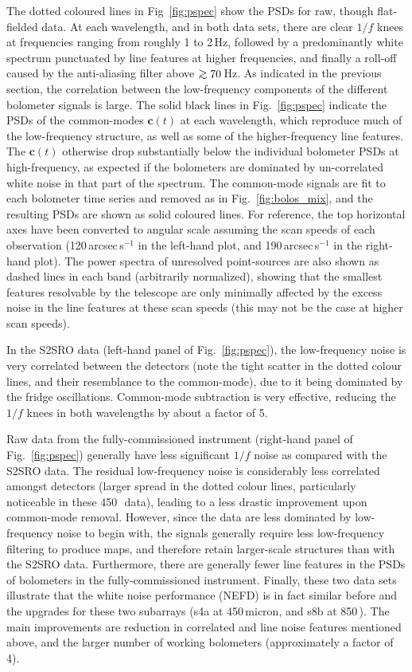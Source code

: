 \documentclass[useAMS,usenatbib,nofootinbib]{mn2e}
\def\gsim{\mathrel{\lower2.5pt\vbox{\lineskip=0pt\baselineskip=0pt
          \hbox{$>$}\hbox{$\sim$}}}}
\begin{document}
The dotted coloured lines in Fig~\ref{fig:pspec} show the PSDs for
raw, though flat-fielded data. At each wavelength, and in both data
sets, there are clear $1/f$ knees at frequencies ranging from roughly
1 to 2\,Hz, followed by a predominantly white spectrum punctuated by
line features at higher frequencies, and finally a roll-off caused by
the anti-aliasing filter above $\gsim 70$\,Hz. As indicated in the
previous section, the correlation between the low-frequency components
of the different bolometer signals is large. The solid black lines in
Fig.~\ref{fig:pspec} indicate the PSDs of the common-modes
$\mathbf{c}(t)$ at each wavelength, which reproduce much of the
low-frequency structure, as well as some of the higher-frequency line
features. The $\mathbf{c}(t)$ otherwise drop substantially below the
individual bolometer PSDs at high-frequency, as expected if the
bolometers are dominated by un-correlated white noise in that part of
the spectrum. The common-mode signals are fit to each bolometer time
series and removed as in Fig.~\ref{fig:bolos_mix}, and the resulting
PSDs are shown as solid coloured lines.  For reference, the top
horizontal axes have been converted to angular scale assuming the scan
speeds of each observation (120\,arcsec\,s$^{-1}$ in the left-hand
plot, and 190\,arcsec\,s$^{-1}$ in the right-hand plot). The power
spectra of unresolved point-sources are also shown as dashed lines in
each band (arbitrarily normalized), showing that the smallest features
resolvable by the telescope are only minimally affected by the excess
noise in the line features at these scan speeds (this may not be the
case at higher scan speeds).

In the S2SRO data (left-hand panel of Fig.~\ref{fig:pspec}), the
low-frequency noise is very correlated between the detectors (note the
tight scatter in the dotted colour lines, and their resemblance to the
common-mode), due to it being dominated by the fridge
oscillations. Common-mode subtraction is very effective, reducing the
$1/f$ knees in both wavelengths by about a factor of 5.

Raw data from the fully-commissioned instrument (right-hand panel of
Fig.~\ref{fig:pspec}) generally have less significant $1/f$ noise as
compared with the S2SRO data. The residual low-frequency noise is
considerably less correlated amongst detectors (larger spread in the
dotted colour lines, particularly noticeable in these 450\,\micron\
data), leading to a less drastic improvement upon common-mode
removal. However, since the data are less dominated by low-frequency
noise to begin with, the signals generally require less low-frequency
filtering to produce maps, and therefore retain larger-scale
structures than with the S2SRO data. Furthermore, there are generally
fewer line features in the PSDs of bolometers in the
fully-commissioned instrument. Finally, these two data sets illustrate
that the white noise performance (NEFD) is in fact similar before and
the upgrades for these two subarrays (s4a at 450\,micron, and s8b at
850\,\micron). The main improvements are reduction in correlated and
line noise features mentioned above, and the larger number of working
bolometers (approximately a factor of 4).
\end{document}
